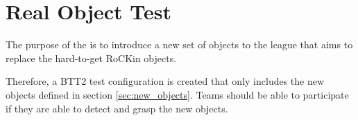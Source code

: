 
\section{Real Object Test}

The purpose of the  is to introduce a new set of objects to the league that aims to replace the hard-to-get RoCKin objects.

Therefore, a BTT2 test configuration is created that only includes the new objects defined in section \ref{sec:new_objects}. Teams should be able to participate if they are able to detect and grasp the new objects.
